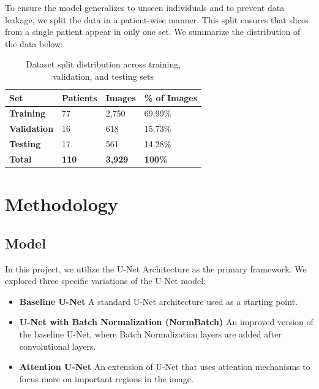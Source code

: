 \documentclass[12pt]{article}
\begin{document}
To ensure the model generalizes to unseen individuals and to prevent data leakage, we split the data in a patient-wise manner. This split ensures that slices from a single patient appear in only one set. We summarize the distribution of the data below:

\begin{table}[h]
\centering
\begin{tabular}{llll}
\toprule
\textbf{Set}        & \textbf{Patients} & \textbf{Images} & \textbf{\% of Images} \\ \midrule
\textbf{Training}   & 77                & 2,750           & 69.99\%               \\ \addlinespace
\textbf{Validation} & 16                & 618             & 15.73\%               \\ \addlinespace
\textbf{Testing}    & 17                & 561             & 14.28\%               \\ \midrule
\textbf{Total}      & \textbf{110}      & \textbf{3,929}  & \textbf{100\%}        \\ \bottomrule
\end{tabular}
\caption{Dataset split distribution across training, validation, and testing sets}
\label{tab:dataset_split}
\end{table}

\section{Methodology}

\subsection{Model}
In this project, we utilize the U-Net Architecture as the primary framework. We explored three specific variations of the U-Net model:
\begin{itemize}
    \item \textbf{Baseline U-Net} A standard U-Net architecture used as a starting point. 
    \item \textbf{U-Net with Batch Normalization (NormBatch)} An improved version of the baseline U-Net, where Batch Normalization layers are added after convolutional layers.
    \item \textbf{Attention U-Net} An extension of U-Net that uses attention mechanisms to focus more on important regions in the image.
\end{itemize}
\end{document}
